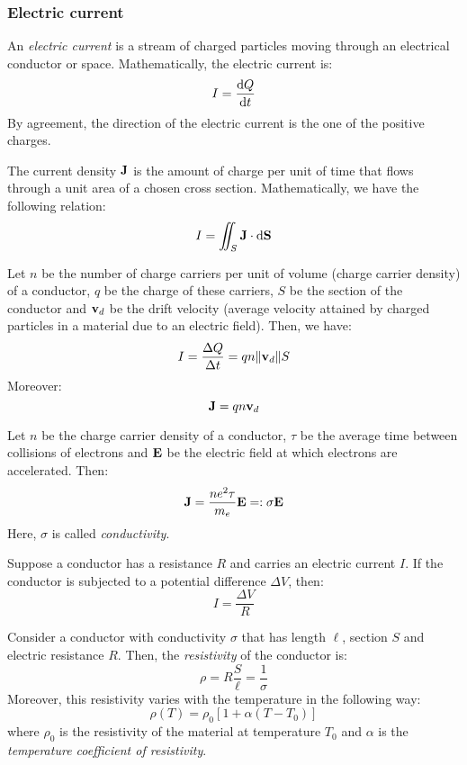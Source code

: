 \documentclass[../../../main.tex]{subfiles}
\begin{document}
\begin{multicols}{2}
  \subsubsection{Electric current}
  \begin{definition}
    An \emph{electric current} is a stream of charged particles moving through an electrical conductor or space. Mathematically, the electric current is: $$I=\dv{Q}{t}$$
    By agreement, the direction of the electric current is the one of the positive charges.
  \end{definition}
  \begin{definition}
    The current density $\boldsymbol{\mathrm{J}}$ is the amount of charge per unit of time that flows through a unit area of a chosen cross section. Mathematically, we have the following relation: $$I=\iint_S\boldsymbol{\mathrm{J}}\cdot\dd \boldsymbol{\mathrm{S}}$$
  \end{definition}
  \begin{prop}
    Let $n$ be the number of charge carriers per unit of volume (charge carrier density) of a conductor, $q$ be the charge of these carriers, $S$ be the section of the conductor and $\boldsymbol{\mathrm{v}}_d$ be the drift velocity (average velocity attained by charged particles in a material due to an electric field). Then, we have:
    $$I=\frac{\Delta Q}{\Delta t}=q n \|\boldsymbol{\mathrm{v}}_d\|S$$
    Moreover: $$\boldsymbol{\mathrm{J}}=q n\boldsymbol{\mathrm{v}}_d$$
  \end{prop}
  \begin{law}
    Let $n$ be the charge carrier density of a conductor, $\tau$ be the average time between collisions of electrons and $\boldsymbol{\mathrm{E}}$ be the electric field at which electrons are accelerated. Then: $$\boldsymbol{\mathrm{J}}=\frac{ne^2\tau}{m_e}\boldsymbol{\mathrm{E}}=:\sigma\boldsymbol{\mathrm{E}}$$
    Here, $\sigma$ is called \emph{conductivity}.
  \end{law}
  \begin{law}
    Suppose a conductor has a resistance $R$ and carries an electric current $I$. If the conductor is subjected to a potential difference $\Delta V$, then: $$I=\frac{\Delta V}{R}$$
  \end{law}
  \begin{definition}[Resistivity]
    Consider a conductor with conductivity $\sigma$ that has length $\ell$, section $S$ and electric resistance $R$. Then, the \emph{resistivity} of the conductor is: $$\rho=R\frac{S}{\ell}=\frac{1}{\sigma}$$
    Moreover, this resistivity varies with the temperature in the following way: $$\rho(T)=\rho_0\left[1+\alpha(T-T_0)\right]$$
    where $\rho_0$ is the resistivity of the material at temperature $T_0$ and $\alpha$ is the \emph{temperature coefficient of resistivity}.

\end{definition}
\end{multicols}
\end{document}
